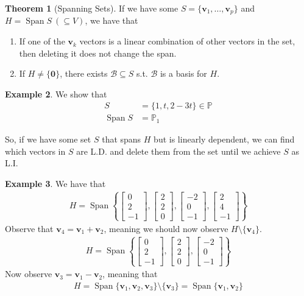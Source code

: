 \documentclass{article}
\numberwithin{equation}{section}
\theoremstyle{definition}
\newtheorem{thm}{Theorem}[subsection]
\newtheorem{ex}[thm]{Example}
\newcommand{\V}{\mathbf{v}}
\DeclareMathOperator{\spa}{Span}
\theoremstyle{adefn}
\begin{document}
	\begin{thm}[Spanning Sets]
		If we have some $S = \{\V_1, \ldots, \V_p\}$ and $H = \spa S\ (\subseteq V)$, we have that
		\begin{enumerate}
			\itemsep0em
			\item If one of the $\V_k$ vectors is a linear combination of other vectors in the set, then deleting it does not change the span. 
			\item If $H \neq \{\mathbf{0}\}$, there exists $\mathcal{B} \subseteq S$ s.t. $\mathcal{B}$ is a basis for $H$. 
		\end{enumerate}
	\end{thm}
	\begin{ex}
		We show that 
		\begin{align*}
			S &= \{1, t, 2-3t\} \in \mathbb{P} \\ 
			\spa S &= \mathbb{P}_1
		\end{align*}
	\end{ex}
		So, if we have some set $S$ that spans $H$ but is linearly dependent, we can find which vectors in $S$ are L.D. and delete them from the set until we achieve $S$ as L.I.
	\begin{ex}
		We have that 
		\begin{align*}
			H = \spa\left\{ \begin{bmatrix}
				0 \\ 2 \\ -1
			\end{bmatrix}, \begin{bmatrix}
				2 \\ 2 \\ 0
			\end{bmatrix}, \begin{bmatrix}
				-2 \\ 0 \\ -1
			\end{bmatrix}, \begin{bmatrix}
				2 \\ 4 \\ -1
			\end{bmatrix} \right\}
		\end{align*}
		Observe that $\V_4 = \V_1 + \V_2$, meaning we should now observe $H \setminus \{\V_4\}$.
		\begin{align*}
			H = \spa\left\{ \begin{bmatrix}
				0 \\ 2 \\ -1
			\end{bmatrix}, \begin{bmatrix}
				2 \\ 2 \\ 0
			\end{bmatrix}, \begin{bmatrix}
				-2 \\ 0 \\ -1
			\end{bmatrix} \right\}
		\end{align*} 
		Now observe $\V_3 = \V_1 - \V_2$, meaning that 
		\begin{align*}
			H = \spa \{\V_1, \V_2, \V_3\} \setminus \{\V_3\} = \spa\{\V_1, \V_2\}
		\end{align*}
	\end{ex}		
\end{document}
